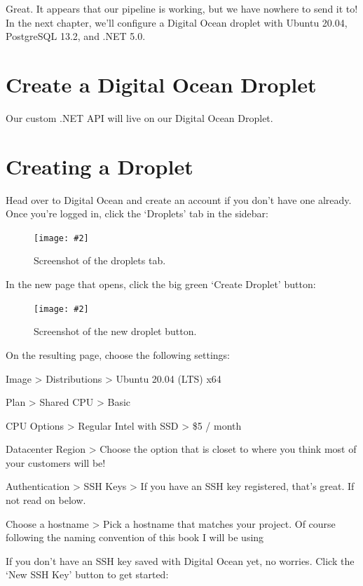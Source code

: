 \documentclass[a4paper,
                             oneside,
                             BCOR1.0cm,
                             DIV11,
                             parskip=full,
                             11pt]{scrbook}
\newcommand{\standardfigure}[3]{\begin{figure}[H]\begin{center}\texttt{[image: \#2]}\caption{#3}\end{center}\end{figure}}
\begin{document}
Great. It appears that our pipeline is working, but we have nowhere to send it to! In the next chapter, we'll configure a Digital Ocean droplet with Ubuntu 20.04, PostgreSQL 13.2, and .NET 5.0.

\section{Create a Digital Ocean Droplet}\label{cap:primer}

Our custom .NET API will live on our Digital Ocean Droplet.

\section{Creating a Droplet}

Head over to Digital Ocean and create an account if you don't have one already. Once you're logged in, click the `Droplets' tab in the sidebar:

\standardfigure{\textwidth/2}{droplet/droplets-tab}{Screenshot of the droplets tab.}

In the new page that opens, click the big green `Create Droplet' button:

\standardfigure{\textwidth}{droplet/new-droplet}{Screenshot of the new droplet button.}

On the resulting page, choose the following settings:

\begin{arrows}
\item Image > Distributions > Ubuntu 20.04 (LTS) x64
\item Plan > Shared CPU > Basic
\item CPU Options > Regular Intel with SSD > \$5 / month
\item Datacenter Region > Choose the option that is closet to where you think most of your customers will be!
\item Authentication > SSH Keys > If you have an SSH key registered, that's great. If not read on below.
\item Choose a hostname > Pick a hostname that matches your project. Of course following the naming convention of this book I will be using 
\end{arrows}


If you don't have an SSH key saved with Digital Ocean yet, no worries. Click the `New SSH Key' button to get started:
\end{document}
